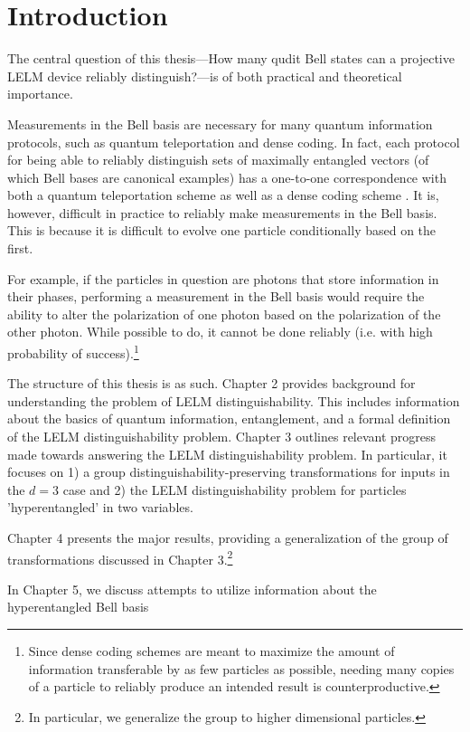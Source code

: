 \chapter{Introduction}

The central question of this thesis---How many qudit Bell states can a projective LELM device reliably distinguish?---is of both practical and theoretical importance. 

Measurements in the Bell basis are necessary for many quantum information protocols, such as quantum teleportation and dense coding. In fact, each protocol for being able to reliably distinguish sets of maximally entangled vectors (of which Bell bases are canonical examples) has a one-to-one correspondence with both a quantum teleportation scheme as well as a dense coding scheme \cite{coding}. It is, however, difficult in practice to reliably make measurements in the Bell basis. This is because it is difficult to evolve one particle conditionally based on the first. 

For example, if the particles in question are photons that store information in their phases, performing a measurement in the Bell basis would require the ability to alter the polarization of one photon based on the polarization of the other photon. While possible to do, it cannot be done reliably (i.e. with high probability of success).\footnote{Since dense coding schemes are meant to maximize the amount of information transferable by as few particles as possible, needing many copies of a particle to reliably produce an intended result is counterproductive.}


The structure of this thesis is as such. Chapter 2 provides background for understanding the problem of LELM distinguishability. This includes information about the basics of quantum information, entanglement, and a formal definition of the LELM distinguishability problem. Chapter 3 outlines relevant progress made towards answering the LELM distinguishability problem. In particular, it focuses on 1) a group distinguishability-preserving transformations for inputs in the $d=3$ case and 2) the LELM distinguishability problem for particles 'hyperentangled' in two variables.


Chapter 4 presents the major results, providing a generalization of the group of transformations discussed in Chapter 3.\footnote{In particular, we generalize the group to higher dimensional particles.}


In Chapter 5, we discuss attempts to utilize information about the hyperentangled Bell basis 

